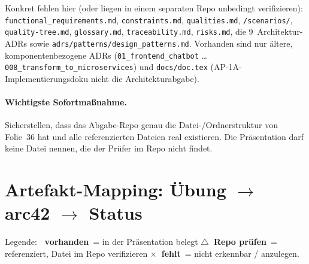 \documentclass[11pt,a4paper]{article}
\newcommand{\ok}{\textcolor{good}{\textbf{\checkmark\ vorhanden}}}
\newcommand{\warnref}{\textcolor{warn}{\textbf{$\triangle$\ Repo pr\"ufen}}}
\newcommand{\miss}{\textcolor{bad}{\textbf{$\times$\ fehlt}}}
\begin{document}
Konkret fehlen hier (oder liegen in einem separaten Repo \textendash{} unbedingt
verifizieren): \texttt{functional\_requirements.md}, \texttt{constraints.md},
\texttt{qualities.md}, \texttt{/scenarios/}, \texttt{quality-tree.md},
\texttt{glossary.md}, \texttt{traceability.md}, \texttt{risks.md}, die
9~Architektur-ADRs sowie \texttt{adrs/patterns/design\_patterns.md}.
Vorhanden sind nur \"altere, komponentenbezogene ADRs
(\texttt{01\_frontend\_chatbot} \dots{} \texttt{008\_transform\_to\_microservices})
und \texttt{docs/doc.tex} (AP-1A-Implementierungsdoku \textendash{} nicht die
Architekturabgabe).

\paragraph{Wichtigste Sofortma{\ss}nahme.} Sicherstellen, dass das Abgabe-Repo
genau die Datei-/Ordnerstruktur von Folie~36 hat und alle referenzierten Dateien
real existieren. Die Pr\"asentation darf keine Datei nennen, die der Pr\"ufer im
Repo nicht findet.

\section{Artefakt-Mapping: \"Ubung $\rightarrow$ arc42 $\rightarrow$ Status}
Legende: \ok\ = in der Pr\"asentation belegt \quad
\warnref\ = referenziert, Datei im Repo verifizieren \quad
\miss\ = nicht erkennbar / anzulegen.
\end{document}
